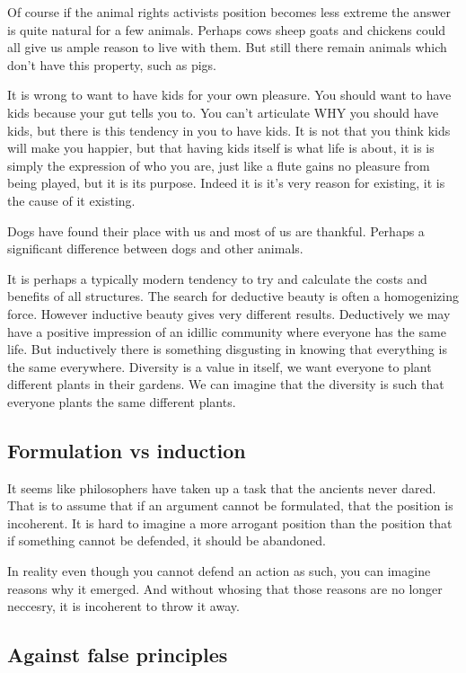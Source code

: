 Of course if the animal rights activists position becomes less extreme the answer is quite natural for a few animals. Perhaps cows sheep goats and chickens could all give us ample reason to live with them. But still there remain animals which don't have this property, such as pigs. 

It is wrong to want to have kids for your own pleasure. You should want to have kids because your gut tells you to. You can't articulate WHY you should have kids, but there is this tendency in you to have kids. It is not that you think kids will make you happier, but that having kids itself is what life is about, it is is simply the expression of who you are, just like a flute gains no pleasure from being played, but it is its purpose. Indeed it is it's very reason for existing, it is the cause of it existing. 

Dogs have found their place with us and most of us are thankful. Perhaps a significant difference between dogs and other animals. 

It is perhaps a typically modern tendency to try and calculate the costs and benefits of all structures.  The search for deductive beauty is often a homogenizing force. However inductive beauty gives very different results. Deductively we may have a positive impression of an idillic community where everyone has the same life. But inductively there is something disgusting in knowing that everything is the same everywhere. Diversity is a value in itself, we want everyone to plant different plants in their gardens. We can imagine that the diversity is such that everyone plants the same different plants. 


\subsection{Formulation vs induction}
It seems like philosophers have taken up a task that the ancients never dared. That is to assume that if an argument cannot be formulated, that the position is incoherent. It is hard to imagine a more arrogant position than the position that if something cannot be defended, it should be abandoned. 

In reality even though you cannot defend an action as such, you can imagine reasons why it emerged. And without whosing that those reasons are no longer neccesry, it is incoherent to throw it away. 

\subsection{Against false principles}


